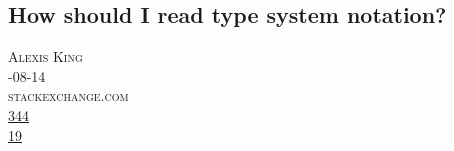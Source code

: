 \documentclass[10pt,a4paper]{article}
\begin{document}
\subsection{How should I read type system notation?}
\noindent\begin{minipage}[t]{0.20\linewidth}
\vspace{0pt}
\noindent\textsc{\footnotesize
{\scriptsize\faUser}\space 
Alexis King \\
{\scriptsize\faCalendar}-08-14 \\
{\scriptsize\faGlobe}\space 
stackexchange.com \\
{\scriptsize\faThumbsOUp}\space 
\href{http://news.ycombinator.com/item?id=37138807\&utm\_term=comment}{344} \\
{\scriptsize\faComments}\space 
\href{http://news.ycombinator.com/item?id=37138807\&utm\_term=comment}{19} \\
}
\end{minipage} %
\end{document}
